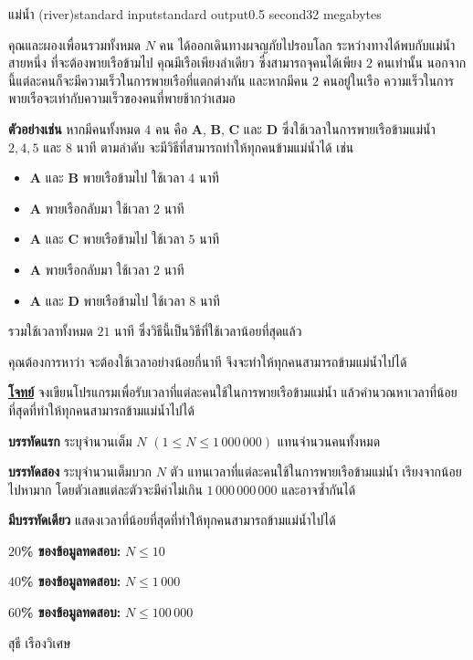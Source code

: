 \documentclass[11pt,a4paper]{article}
\begin{document}
\begin{problem}{แม่น้ำ (river)}{standard input}{standard output}{0.5 second}{32 megabytes}

คุณและผองเพื่อนรวมทั้งหมด $N$ คน ได้ออกเดินทางผจญภัยไปรอบโลก ระหว่างทางได้พบกับแม่น้ำสายหนึ่ง ที่จะต้องพายเรือข้ามไป คุณมีเรือเพียงลำเดียว ซึ่งสามารถจุคนได้เพียง $2$ คนเท่านั้น นอกจากนี้แต่ละคนก็จะมีความเร็วในการพายเรือที่แตกต่างกัน และหากมีคน $2$ คนอยู่ในเรือ ความเร็วในการพายเรือจะเท่ากับความเร็วของคนที่พายช้ากว่าเสมอ

\textbf{ตัวอย่างเช่น} หากมีคนทั้งหมด $4$ คน คือ \textbf{A}, \textbf{B}, \textbf{C} และ \textbf{D} ซึ่งใช้เวลาในการพายเรือข้ามแม่น้ำ $2, 4, 5$ และ $8$ นาที ตามลำดับ จะมีวิธีที่สามารถทำให้ทุกคนข้ามแม่น้ำได้ เช่น

\begin{itemize}

\item \textbf{A} และ \textbf{B} พายเรือข้ามไป ใช้เวลา $4$ นาที
\item \textbf{A} พายเรือกลับมา ใช้เวลา $2$ นาที
\item \textbf{A} และ \textbf{C} พายเรือข้ามไป ใช้เวลา $5$ นาที
\item \textbf{A} พายเรือกลับมา ใช้เวลา $2$ นาที
\item \textbf{A} และ \textbf{D} พายเรือข้ามไป ใช้เวลา $8$ นาที
\end{itemize}

รวมใช้เวลาทั้งหมด $21$ นาที ซึ่งวิธีนี้เป็นวิธีที่ใช้เวลาน้อยที่สุดแล้ว

คุณต้องการหาว่า จะต้องใช้เวลาอย่างน้อยกี่นาที จึงจะทำให้ทุกคนสามารถข้ามแม่น้ำไปได้

\bigskip
\underline{\textbf{โจทย์}}  จงเขียนโปรแกรมเพื่อรับเวลาที่แต่ละคนใช้ในการพายเรือข้ามแม่น้ำ แล้วคำนวณหาเวลาที่น้อยที่สุดที่ทำให้ทุกคนสามารถข้ามแม่น้ำไปได้



\InputFile

\textbf{บรรทัดแรก} ระบุจำนวนเต็ม $N$ $(1 \leq N \leq 1\,000\,000)$ แทนจำนวนคนทั้งหมด

\textbf{บรรทัดสอง} ระบุจำนวนเต็มบวก $N$ ตัว แทนเวลาที่แต่ละคนใช้ในการพายเรือข้ามแม่น้ำ เรียงจากน้อยไปหามาก โดยตัวเลขแต่ละตัวจะมีค่าไม่เกิน $1\,000\,000\,000$ และอาจซ้ำกันได้




\OutputFile

\textbf{มีบรรทัดเดียว} แสดงเวลาที่น้อยที่สุดที่ทำให้ทุกคนสามารถข้ามแม่น้ำไปได้

\Examples

\begin{example}
%
%
\end{example}

\Scoring

\textbf{$20$\% ของข้อมูลทดสอบ:} $N \leq 10$

\textbf{$40$\% ของข้อมูลทดสอบ:} $N \leq 1\,000$

\textbf{$60$\% ของข้อมูลทดสอบ:} $N \leq 100\,000$


\Source

สุธี เรืองวิเศษ

\end{problem}
\end{document}
